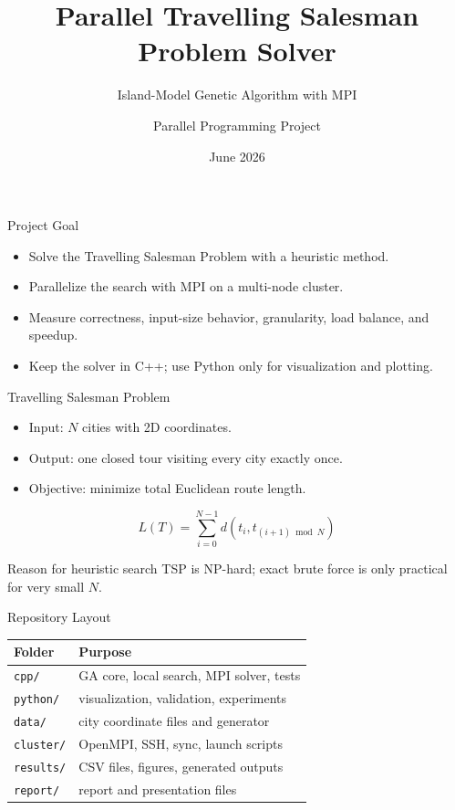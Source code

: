 \documentclass[aspectratio=169]{beamer}
\title[Parallel TSP]{Parallel Travelling Salesman Problem Solver}
\subtitle{Island-Model Genetic Algorithm with MPI}
\author{Parallel Programming Project}
\date{June 2026}
\begin{document}
\begin{frame}
  \titlepage
\end{frame}

\begin{frame}{Project Goal}
  \begin{itemize}
    \item Solve the Travelling Salesman Problem with a heuristic method.
    \item Parallelize the search with MPI on a multi-node cluster.
    \item Measure correctness, input-size behavior, granularity, load balance, and speedup.
    \item Keep the solver in C++; use Python only for visualization and plotting.
  \end{itemize}
\end{frame}

\begin{frame}{Travelling Salesman Problem}
  \begin{itemize}
    \item Input: $N$ cities with 2D coordinates.
    \item Output: one closed tour visiting every city exactly once.
    \item Objective: minimize total Euclidean route length.
  \end{itemize}
  \[
    L(T) = \sum_{i=0}^{N-1} d(t_i, t_{(i+1) \bmod N})
  \]
  \begin{block}{Reason for heuristic search}
    TSP is NP-hard; exact brute force is only practical for very small $N$.
  \end{block}
\end{frame}

\begin{frame}{Repository Layout}
  \begin{tabular}{ll}
    \toprule
    Folder & Purpose \\
    \midrule
    \texttt{cpp/} & GA core, local search, MPI solver, tests \\
    \texttt{python/} & visualization, validation, experiments \\
    \texttt{data/} & city coordinate files and generator \\
    \texttt{cluster/} & OpenMPI, SSH, sync, launch scripts \\
    \texttt{results/} & CSV files, figures, generated outputs \\
    \texttt{report/} & report and presentation files \\
    \bottomrule
  \end{tabular}
\end{frame}
\end{document}
